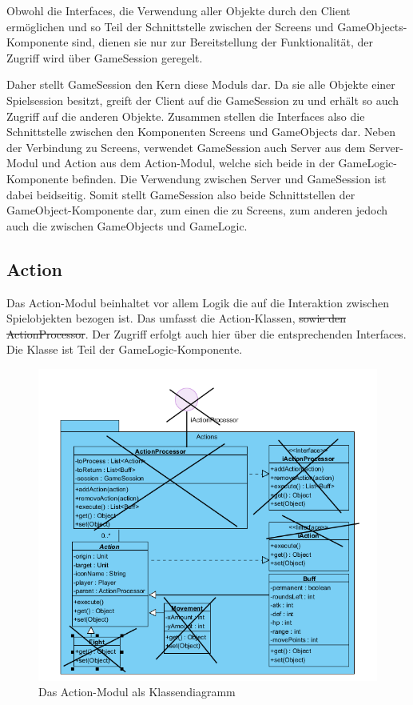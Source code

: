 \documentclass[fontsize=12pt,paper=a4,twoside]{scrartcl}
\begin{document}
Obwohl die Interfaces, die Verwendung aller Objekte durch den Client ermöglichen und so Teil der Schnittstelle zwischen der Screens und GameObjects-Komponente sind, dienen sie nur zur Bereitstellung der Funktionalität, der Zugriff wird über GameSession geregelt.

Daher stellt GameSession den Kern diese Moduls dar. Da sie alle Objekte einer Spielsession besitzt, greift der Client auf die GameSession zu und erhält so auch Zugriff auf die anderen Objekte. Zusammen stellen die Interfaces also die Schnittstelle zwischen den Komponenten Screens und GameObjects dar. Neben der Verbindung zu Screens, verwendet GameSession auch Server aus dem Server-Modul und Action aus dem Action-Modul, welche sich beide in der GameLogic-Komponente befinden. Die Verwendung zwischen Server und GameSession ist dabei beidseitig. Somit stellt GameSession also beide Schnittstellen der GameObject-Komponente dar, zum einen die zu Screens, zum anderen jedoch auch die zwischen GameObjects und GameLogic.

\subsection{Action}
Das Action-Modul beinhaltet vor allem Logik die auf die Interaktion zwischen Spielobjekten bezogen ist. Das umfasst die Action-Klassen, \sout{sowie den ActionProcessor}. Der Zugriff erfolgt auch hier über die entsprechenden Interfaces. Die Klasse ist Teil der GameLogic-Komponente.

\begin{figure}[h]
\centering
\includegraphics[width=1.0\linewidth]{ActionClass}
\caption{Das Action-Modul als Klassendiagramm}
\label{fig:ActionClass}
\end{figure}
\end{document}
